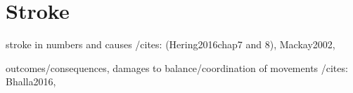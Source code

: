
\section{Stroke}

stroke in numbers and causes /cites: (Hering2016chap7 and 8), Mackay2002,

outcomes/consequences, damages to balance/coordination of movements /cites: Bhalla2016, 

